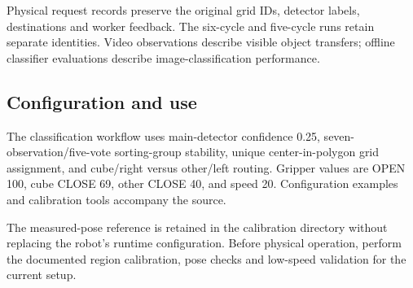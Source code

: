 Physical request records preserve the original grid IDs, detector labels, destinations and worker feedback. The six-cycle and five-cycle runs retain separate identities. Video observations describe visible object transfers; offline classifier evaluations describe image-classification performance. 

\subsection{Configuration and use}
The classification workflow uses main-detector confidence 0.25, seven-observation/five-vote sorting-group stability, unique center-in-polygon grid assignment, and cube/right versus other/left routing. Gripper values are OPEN 100, cube CLOSE 69, other CLOSE 40, and speed 20. Configuration examples and calibration tools accompany the source.

The measured-pose reference is retained in the calibration directory without replacing the robot's runtime configuration. Before physical operation, perform the documented region calibration, pose checks and low-speed validation for the current setup. 
